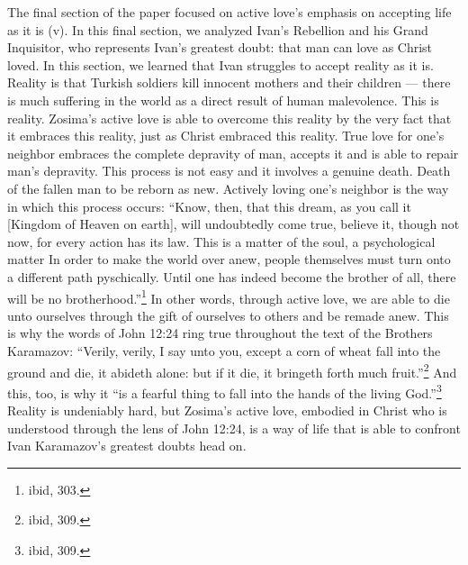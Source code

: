 The final section of the paper focused on active love's emphasis on accepting life as it is (v). In this final section, we analyzed Ivan's Rebellion and his Grand Inquisitor, who represents Ivan's greatest doubt: that man can love as Christ loved. In this section, we learned that Ivan struggles to accept reality as it is. Reality is that Turkish soldiers kill innocent mothers and their children --- there is much suffering in the world as a direct result of human malevolence. This is reality. Zosima's active love is able to overcome this reality by the very fact that it embraces this reality, just as Christ embraced this reality. True love for one's neighbor embraces the complete depravity of man, accepts it and is able to repair man's depravity. This process is not easy and it involves a genuine death. Death of the fallen man to be reborn as new. Actively loving one's neighbor is the way in which this process occurs: ``Know, then, that this dream, as you call it [Kingdom of Heaven on earth], will undoubtedly come true, believe it, though not now, for every action has its law. This is a matter of the soul, a psychological matter In order to make the world over anew, people themselves must turn onto a different path pyschically. Until one has indeed become the brother of all, there will be no brotherhood.''\footnote{ibid, 303.} In other words, through active love, we are able to die unto ourselves through the gift of ourselves to others and be remade anew. This is why the words of John 12:24 ring true throughout the text of the Brothers Karamazov: ``Verily, verily, I say unto you, except a corn of wheat fall into the ground and die, it abideth alone: but if it die, it bringeth forth much fruit.''\footnote{ibid, 309.} And this, too, is why it ``is a fearful thing to fall into the hands of the living God.''\footnote{ibid, 309.} Reality is undeniably hard, but Zosima's active love, embodied in Christ who is understood through the lens of John 12:24, is a way of life that is able to confront Ivan Karamazov's greatest doubts head on.
